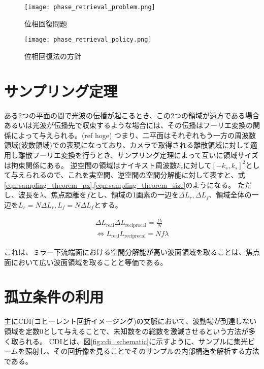 \begin{figure}[!ht]
\centering
\texttt{[image: phase\_retrieval\_problem.png]}
\caption{位相回復問題}
\label{fig:phase_retrieval_problem}
\end{figure}

\begin{figure}[!ht]
\centering
\texttt{[image: phase\_retrieval\_policy.png]}
\caption{位相回復法の方針}
\label{fig:phase_retrieval_policy}
\end{figure}

\clearpage
\newpage


\section{サンプリング定理}
\label{chap3_sampling_theorem}

ある2つの平面の間で光波の伝播が起こるとき、この2つの領域が遠方である場合あるいは光波が伝播先で収束するような場合には、その伝播はフーリエ変換の関係によって与えられる。(ref hoge)
つまり、二平面はそれぞれもう一方の周波数領域(波数領域)での表現になっており、カメラで取得される離散領域に対して適用し離散フーリエ変換を行うとき、サンプリング定理によって互いに領域サイズは拘束関係にある。
逆空間の領域はナイキスト周波数$k_s$に対して$[-k_s, k_s]^2$として与えられるので、これを実空間、逆空間の空間分解能に対して表すと、式\ref{eqn:sampling_theorem_px},\ref{eqn:sampling_theorem_size}のようになる。
ただし、波長を$\lambda$、焦点距離を$f$とし、領域の1画素の一辺を$\Delta L_r, \Delta L_f$、領域全体の一辺を$L_r=N \Delta L_r, L_f = N \Delta L_f$とする。

\begin{eqnarray}
  \Delta L_{\mathrm{real}} \Delta L_{\mathrm{reciprocal}} = \frac{f  \lambda}{N} \label{eqn:sampling_theorem_px} \\
  \Leftrightarrow 
  L_{\mathrm{real}} L_{\mathrm{reciprocal}} = N f \lambda \label{eqn:sampling_theorem_size}
\end{eqnarray}

これは、ミラー下流端面における空間分解能が高い波面領域を取ることは、焦点面において広い波面領域を取ることと等価である。

\clearpage
\newpage

\section{孤立条件の利用}
\label{chap3_solitude_introduction}
主にCDI(コヒーレント回折イメージング)の文脈において、波動場が到達しない領域を定数0として与えることで、未知数をの総数を激減させるという方法が多く取られる。
CDIとは、図\ref{fig:cdi_schematic}に示すように、サンプルに集光ビームを照射し、その回折像を見ることでそのサンプルの内部構造を解析する方法である。

